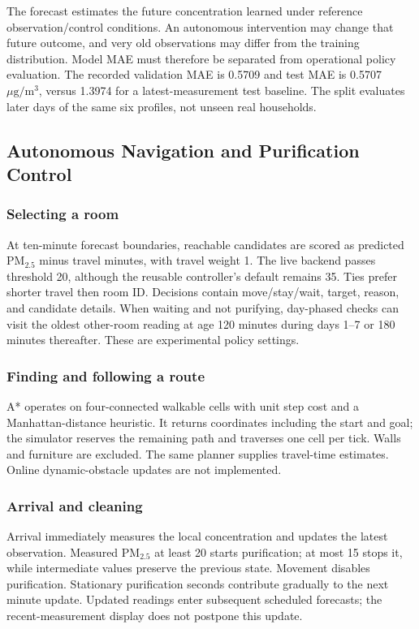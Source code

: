 \documentclass[conference]{IEEEtran}
\newcommand{\pmfine}{\ensuremath{\mathrm{PM}_{2.5}}}
\newcommand{\pmunit}{\ensuremath{\mu\mathrm{g}/\mathrm{m}^3}}
\begin{document}
The forecast estimates the future concentration learned under reference observation/control conditions. An autonomous intervention may change that future outcome, and very old observations may differ from the training distribution. Model MAE must therefore be separated from operational policy evaluation. The recorded validation MAE is 0.5709 and test MAE is 0.5707 \pmunit{}, versus 1.3974 for a latest-measurement test baseline. The split evaluates later days of the same six profiles, not unseen real households.

\subsection{Autonomous Navigation and Purification Control}

\subsubsection{Selecting a room}

At ten-minute forecast boundaries, reachable candidates are scored as predicted \pmfine{} minus travel minutes, with travel weight 1. The live backend passes threshold 20, although the reusable controller's default remains 35. Ties prefer shorter travel then room ID. Decisions contain move/stay/wait, target, reason, and candidate details. When waiting and not purifying, day-phased checks can visit the oldest other-room reading at age 120 minutes during days 1--7 or 180 minutes thereafter. These are experimental policy settings.

\subsubsection{Finding and following a route}

A* operates on four-connected walkable cells with unit step cost and a Manhattan-distance heuristic. It returns coordinates including the start and goal; the simulator reserves the remaining path and traverses one cell per tick. Walls and furniture are excluded. The same planner supplies travel-time estimates. Online dynamic-obstacle updates are not implemented. \cite{ref12}

\subsubsection{Arrival and cleaning}

Arrival immediately measures the local concentration and updates the latest observation. Measured \pmfine{} at least 20 starts purification; at most 15 stops it, while intermediate values preserve the previous state. Movement disables purification. Stationary purification seconds contribute gradually to the next minute update. Updated readings enter subsequent scheduled forecasts; the recent-measurement display does not postpone this update.
\end{document}
